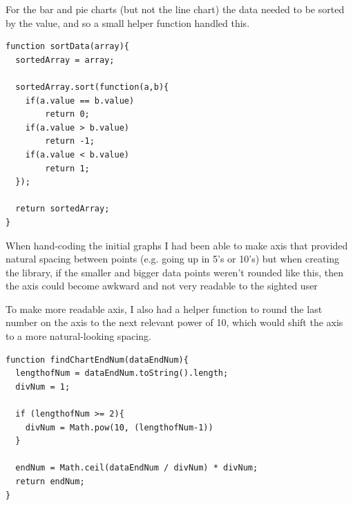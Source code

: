 \documentclass[ %
                    author={Aleena Baig},
                supervisor={Dr Simon Lock},
                    degree={BSc},
                     title={On Making Web Accessible Graphs},
                  subtitle={},
                      year={2019} ]{dissertation}
\begin{document}
For the bar and pie charts (but not the line chart) the data needed to be sorted by the value, and so a small helper function handled this.

\begin{lstlisting}
function sortData(array){
  sortedArray = array;

  sortedArray.sort(function(a,b){
    if(a.value == b.value)
        return 0;
    if(a.value > b.value)
        return -1;
    if(a.value < b.value)
        return 1;
  });

  return sortedArray;
}
\end{lstlisting}

When hand-coding the initial graphs I had been able to make axis that provided natural spacing between points (e.g. going up in 5's or 10's) but when creating the library, if the smaller and bigger data points weren't rounded like this, then the axis could become awkward and not very readable to the sighted user

To make more readable axis, I also had a helper function to round the last number on the axis to the next relevant power of 10, which would shift the axis to a more natural-looking spacing.

\begin{lstlisting}
function findChartEndNum(dataEndNum){
  lengthofNum = dataEndNum.toString().length;
  divNum = 1;

  if (lengthofNum >= 2){
    divNum = Math.pow(10, (lengthofNum-1))
  }

  endNum = Math.ceil(dataEndNum / divNum) * divNum;
  return endNum;
}
\end{lstlisting}
\end{document}
